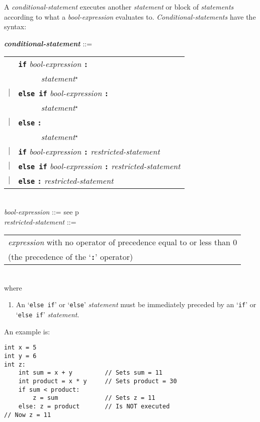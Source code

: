 \documentclass[12pt]{article}
\newcommand{\TT}[1]{{\tt \bfseries #1}}
\newcommand{\STAR}{{\Large $^\star$}}
\newcommand{\ttkey}[1]{{\tt \bfseries #1}}
\newcommand{\emkey}[1]{{\em \bfseries #1}}
\newcommand{\pagref}[1]{p\pageref{#1}}
\newenvironment{indpar}[1][0.3in]%
	{\begin{list}{}%
		     {\setlength{\itemsep}{0in}%
		      \setlength{\topsep}{0in}%
		      \setlength{\parsep}{1ex}%
		      \setlength{\labelwidth}{#1}%
		      \setlength{\leftmargin}{#1}%
		      \addtolength{\leftmargin}{\labelsep}}%
	 \item}%
	{\end{list}}
\begin{document}
A {\em conditional-statement} executes another {\em statement}
or block of {\em statements} according to what a
{\em bool-expression} evaluates to.
{\em Conditional-statements} have the syntax:

\begin{indpar}
\emkey{conditional-statement} ::= \\
\hspace*{0.5in}\begin{tabular}[t]{rl}
        & \ttkey{if} {\em bool-expression} \TT{:} \\
	& ~~~~~ {\em statement}\STAR{} \\
    $|$ & \ttkey{else if} {\em bool-expression} \TT{:} \\
	& ~~~~~ {\em statement}\STAR{} \\
    $|$ & \ttkey{else} \TT{:} \\
	& ~~~~~ {\em statement}\STAR{} \\
    $|$ & \ttkey{if} {\em bool-expression} \TT{:} {\em restricted-statement} \\
    $|$ & \ttkey{else if} {\em bool-expression} \TT{:}
    		{\em restricted-statement} \\
    $|$ & \ttkey{else} \TT{:} {\em restricted-statement} \\
	\end{tabular}
\\[0.5ex]
{\em bool-expression} ::= see \pagref{BOOL-EXPRESSION}
\\[0.5ex]
{\em restricted-statement}\label{RESTRICTED-STATEMENT} ::= \\
\hspace*{0.5in}\begin{tabular}[t]{@{}l}
   {\em expression} with no operator of precedence equal to or less than 0 \\
   (the precedence of the `\TT{:}' operator) \\
   \end{tabular}
\\[1ex]
where
\begin{enumerate}
\item An `{\tt else if}' or `{\tt else}' {\em statement} must be immediately
preceded by an `{\tt if}' or `{\tt else if}' {\em statement}.
\end{enumerate}
\end{indpar}

An example is:
\begin{indpar}\begin{verbatim}
int x = 5
int y = 6
int z:
    int sum = x + y         // Sets sum = 11
    int product = x * y     // Sets product = 30
    if sum < product:
        z = sum             // Sets z = 11
    else: z = product       // Is NOT executed
// Now z = 11
\end{verbatim}\end{indpar}
\end{document}
